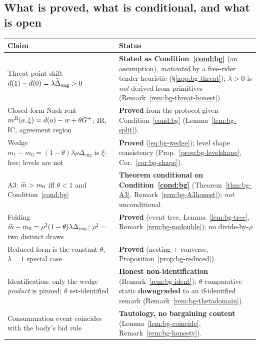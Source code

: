 \subsection{What is proved, what is conditional, and what is open}
\label{app:bg-ledger}

\begin{center}
\renewcommand{\arraystretch}{1.25}
\begin{tabular}{@{}p{}p{}@{}}
\hline
\textbf{Claim} & \textbf{Status} \\
\hline
Threat-point shift $d(1)-d(0)=\lambda\widetilde{\Delta}_{\mathrm{eng}}>0$
  & \textbf{Stated as Condition~\ref{cond:bg}} (an assumption), \emph{motivated}
    by a free-rider tender heuristic (\S\ref{app:bg-threat}); $\lambda>0$ is
    \emph{not} derived from primitives (Remark~\ref{rem:bg-threat-honest}). \\
Closed-form Nash rent $m^{R}(a,\xi)=d(a)-w+\theta G^{+}$; IR, IC, agreement region
  & \textbf{Proved} from the protocol given Condition~\ref{cond:bg}
    (Lemma~\ref{lem:bg-split}). \\
Wedge $m_{1}-m_{0}=(1-\theta)\lambda\rho\Delta_{\mathrm{eng}}$ is $\xi$-free;
levels are not
  & \textbf{Proved} (\eqref{eq:bg-wedge}); level shape consistency
    (Prop.~\ref{prop:bg-levelshape}, Cor.~\ref{cor:bg-shape}). \\
A3: $\widetilde{m}>m_{0}$ iff $\theta<1$ and Condition~\ref{cond:bg}
  & \textbf{Theorem conditional on Condition~\ref{cond:bg}}
    (Theorem~\ref{thm:bg-A3}, Remark~\ref{rem:bg-A3honest}); \emph{not}
    unconditional. \\
Folding $\widetilde{m}-m_{0}=\rho^{2}(1-\theta)\lambda\Delta_{\mathrm{eng}}$; $\rho^{2}$ =
two distinct draws
  & \textbf{Proved} (event tree, Lemma~\ref{lem:bg-tree},
    Remark~\ref{rem:bg-nodouble}); no divide-by-$\rho$. \\
Reduced form is the constant-$\theta$, $\lambda{=}1$ special case
  & \textbf{Proved} (nesting + converse, Proposition~\ref{prop:bg-reduced}). \\
Identification: only the wedge \emph{product} is pinned; $\theta$ set-identified
  & \textbf{Honest non-identification} (Remark~\ref{rem:bg-ident}); $\theta$
    comparative static \textbf{downgraded} to an if-identified remark
    (Remark~\ref{rem:bg-thetadomain}). \\
Consummation event coincides with the body's bid rule
  & \textbf{Tautology, no bargaining content} (Lemma~\ref{lem:bg-coincide},
    Remark~\ref{rem:bg-honesty}). \\

\end{tabular}
\end{center}
